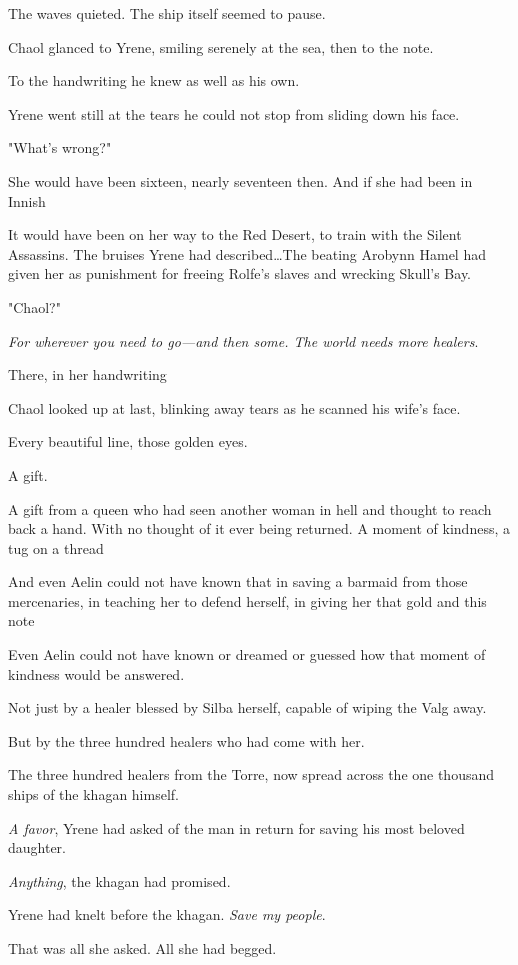 The waves quieted.
The ship itself seemed to pause.

Chaol glanced to Yrene, smiling serenely at the sea, then to the note.

To the handwriting he knew as well as his own.

Yrene went still at the tears he could not stop from sliding down his face.

"What's wrong?"

She would have been sixteen, nearly seventeen then.
And if she had been in Innish 

It would have been on her way to the Red Desert, to train with the Silent Assassins.
The bruises Yrene had described\ldots The beating Arobynn Hamel had given her as punishment for freeing Rolfe's slaves and wrecking Skull's Bay.

"Chaol?"

\emph{For wherever you need to go---and then some.
The world needs more healers}.

There, in her handwriting 

Chaol looked up at last, blinking away tears as he scanned his wife's face.

Every beautiful line, those golden eyes.

A gift.

A gift from a queen who had seen another woman in hell and thought to reach back a hand.
With no thought of it ever being returned.
A moment of kindness, a tug on a thread 

And even Aelin could not have known that in saving a barmaid from those mercenaries, in teaching her to defend herself, in giving her that gold and this note 

Even Aelin could not have known or dreamed or guessed how that moment of kindness would be answered.

Not just by a healer blessed by Silba herself, capable of wiping the Valg away.

But by the three hundred healers who had come with her.

The three hundred healers from the Torre, now spread across the one thousand ships of the khagan himself.

\emph{A favor}, Yrene had asked of the man in return for saving his most beloved daughter.

\emph{Anything}, the khagan had promised.

Yrene had knelt before the khagan.
\emph{Save my people}.

That was all she asked.
All she had begged.

